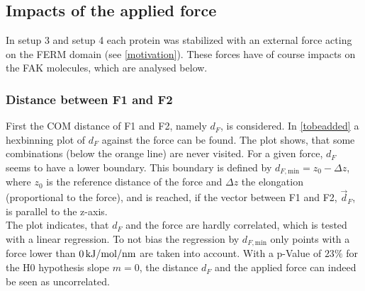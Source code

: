 \subsection{Impacts of the applied force}
In setup 3 and setup 4 each protein was stabilized with an external force acting on the FERM domain (see \autoref{motivation}). These forces have of course impacts on the FAK molecules, which are analysed below.
\subsubsection{Distance between F1 and F2}
First the COM distance of F1 and F2, namely $d_F$, is considered. In \autoref{tobeadded} a hexbinning plot of $d_F$ against the force can be found. The plot shows, that some combinations (below the orange line) are never visited. For a given force, $d_F$ seems to have a lower boundary. This boundary is defined by $d_{F, \text{min}} = z_0 - \Delta z$, where $z_0$ is the reference distance of the force and $\Delta z$ the elongation (proportional to the force), and is reached, if the vector between F1 and F2, $\vec{d}_F$, is parallel to the z-axis.\\
The plot indicates, that $d_F$ and the force are hardly correlated, which is tested with a linear regression. To not bias the regression by $d_{F, \text{min}}$ only points with a force lower than $0\,\si{\kilo\joule/\mole/\nano\metre}$ are taken into account. With a p-Value of $23\%$ for the H0 hypothesis slope $m = 0$, the distance $d_F$ and the applied force can indeed be seen as uncorrelated.
